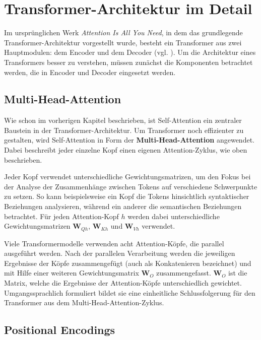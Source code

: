\chapter{Transformer-Architektur im Detail}

Im ursprünglichen Werk \textit{Attention Is All You Need}, in dem das grundlegende Transformer-Architektur vorgestellt wurde, besteht ein Transformer aus zwei Hauptmodulen: dem Encoder und dem Decoder (vgl. \cite[S. 3]{attention}).
Um die Architektur eines Transformers besser zu verstehen, müssen zunächst die Komponenten betrachtet werden, die in Encoder und Decoder eingesetzt werden.

\section{Multi-Head-Attention}

Wie schon im vorherigen Kapitel beschrieben, ist Self-Attention ein zentraler Baustein in der Transformer-Architektur.  
Um Transformer noch effizienter zu gestalten, wird Self-Attention in Form der \textbf{Multi-Head-Attention} angewendet. Dabei beschreibt jeder einzelne Kopf einen eigenen Attention-Zyklus, wie oben beschrieben.

Jeder Kopf verwendet unterschiedliche Gewichtungsmatrizen, um den Fokus bei der Analyse der Zusammenhänge zwischen Tokens auf verschiedene Schwerpunkte zu setzen.  
So kann beispielsweise ein Kopf die Tokens hinsichtlich syntaktischer Beziehungen analysieren, während ein anderer die semantischen Beziehungen betrachtet.  
Für jeden Attention-Kopf \( h \) werden dabei unterschiedliche Gewichtungsmatrizen \( \mathbf{W}_{Qh} \), \( \mathbf{W}_{Kh} \) und \( \mathbf{W}_{Vh} \) verwendet.

Viele Transformermodelle verwenden acht Attention-Köpfe, die parallel ausgeführt werden.  
Nach der parallelen Verarbeitung werden die jeweiligen Ergebnisse der Köpfe zusammengefügt (auch als Konkatenieren bezeichnet) und mit Hilfe einer weiteren Gewichtungsmatrix \( \mathbf{W}_{O} \) zusammengefasst.  
\( \mathbf{W}_{O} \) ist die Matrix, welche die Ergebnisse der Attention-Köpfe unterschiedlich gewichtet.  
Umgangssprachlich formuliert bildet sie eine einheitliche Schlussfolgerung für den Transformer aus dem Multi-Head-Attention-Zyklus.

\section{Positional Encodings}

